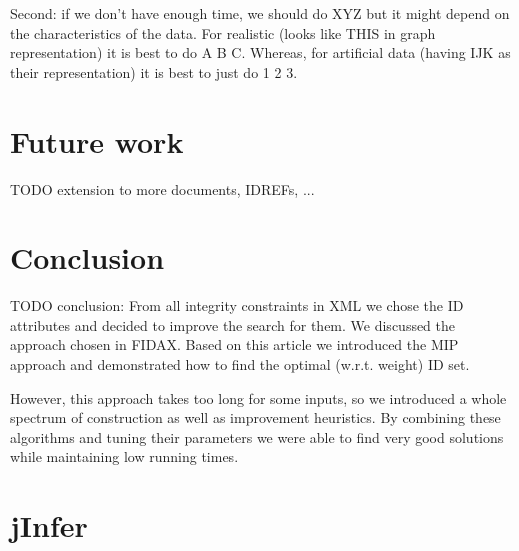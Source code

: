 \documentclass[a4paper,12pt,oneside]{report}
\let\openright=\clearpage
\def\chapwithtoc#1{
\chapter*{#1}
\addcontentsline{toc}{chapter}{#1}
}
\begin{document}
Second: if we don't have enough time, we should do XYZ but it might depend on the characteristics of the data.
For realistic (looks like THIS in graph representation) it is best to do A B C.
Whereas, for artificial data (having IJK as their representation) it is best to just do 1 2 3.

\chapter{Future work}

TODO extension to more documents, IDREFs, ...  

\chapwithtoc{Conclusion}

TODO conclusion: From all integrity constraints in XML we chose the ID attributes and decided to improve the search for them. We discussed the approach chosen in FIDAX. Based on this article we introduced the MIP approach and demonstrated how to find the optimal (w.r.t. weight) ID set.

However, this approach takes too long for some inputs, so we introduced a whole spectrum of construction as well as improvement heuristics. By combining these algorithms and tuning their parameters we were able to find very good solutions while maintaining low running times.

\newpage
\nocite{*}



\listoffigures
{}

\listofalgorithms
{}

\listoftables
{}


\printnomenclature[2cm]


\appendix

\openright
{}

\chapter{jInfer}
\label{jInfer}
\end{document}

